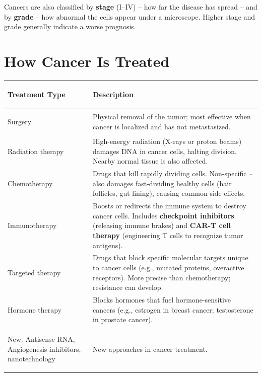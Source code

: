 \documentclass[11pt, letterpaper]{article}
\begin{document}
\vspace{4pt}
Cancers are also classified by \textbf{stage} (I--IV) -- how far the disease has spread -- and by \textbf{grade} -- how abnormal the cells appear under a microscope. Higher stage and grade generally indicate a worse prognosis.

\section*{How Cancer Is Treated}

\noindent
{\renewcommand{\arraystretch}{1.5}
\begin{tabularx}{\textwidth}{>{\bfseries\raggedright\arraybackslash}p{3.5cm}>{\raggedright\arraybackslash}X}
\toprule
\rowcolor{tableheader}
\textbf{Treatment Type} & \textbf{Description} \\
\midrule
\rowcolor{rowA} Surgery            & Physical removal of the tumor; most effective when cancer is localized and has not metastasized. \\
\rowcolor{rowB} Radiation therapy  & High-energy radiation (X-rays or proton beams) damages DNA in cancer cells, halting division. Nearby normal tissue is also affected. \\
\rowcolor{rowA} Chemotherapy       & Drugs that kill rapidly dividing cells. Non-specific -- also damages fast-dividing healthy cells (hair follicles, gut lining), causing common side effects. \\
\rowcolor{rowB} Immunotherapy      & Boosts or redirects the immune system to destroy cancer cells. Includes \textbf{checkpoint inhibitors} (releasing immune brakes) and \textbf{CAR-T cell therapy} (engineering T cells to recognize tumor antigens). \\
\rowcolor{rowA} Targeted therapy   & Drugs that block specific molecular targets unique to cancer cells (e.g., mutated proteins, overactive receptors). More precise than chemotherapy; resistance can develop. \\
\rowcolor{rowB} Hormone therapy    & Blocks hormones that fuel hormone-sensitive cancers (e.g., estrogen in breast cancer; testosterone in prostate cancer). \\
\rowcolor{rowA} New: Antisense RNA, Angiogenesis inhibitors, nanotechnology    & New approaches in cancer treatment. \\
\bottomrule
\end{tabularx}}

\end{document}
